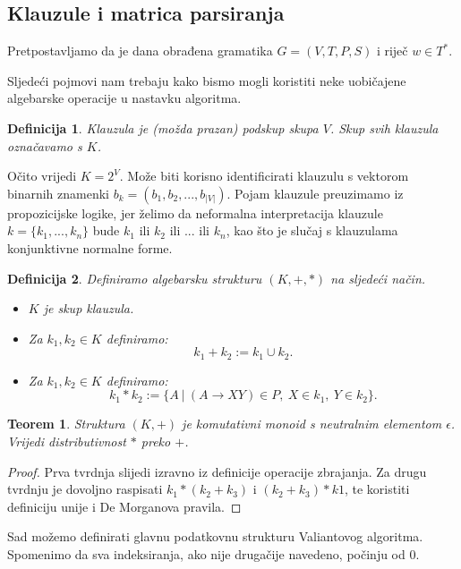 \documentclass[a4paper,oneside,12pt]{article} %
\newtheorem{lmdef}{Definicija}
\newtheorem{lmth}{Teorem}
\begin{document}
    \subsection{Klauzule i matrica parsiranja}
    Pretpostavljamo da je dana obrađena gramatika $G = (V, T, P, S)$ i riječ $w \in T^*$.
    
    Sljedeći pojmovi nam trebaju kako bismo mogli koristiti
        neke uobičajene algebarske operacije u nastavku algoritma.
    
    \begin{lmdef}
        Klauzula je (možda prazan) podskup skupa $V$. 
        Skup svih klauzula označavamo s $K$.
    \end{lmdef}
    Očito vrijedi $K = 2^V$. 
    Može biti korisno identificirati klauzulu s vektorom binarnih znamenki
        $b_k = (b_1, b_2, ..., b_{|V|})$.
    Pojam klauzule preuzimamo iz propozicijske logike,
        jer želimo da neformalna interpretacija klauzule $k = \{k_1, ..., k_n\}$
        bude $k_1$ ili $k_2$ ili ... ili $k_n$,
        kao što je slučaj s klauzulama konjunktivne normalne forme.
    
    \begin{lmdef}
        Definiramo algebarsku strukturu $(K, +, *)$ na sljedeći način.
        \begin{itemize}
            \item $K$ je skup klauzula.
            \item Za $k_1, k_2\in K$ definiramo:
            \[ k_1 + k_2 := k_1 \cup k_2. \]
            \item Za $k_1, k_2\in K$ definiramo:
            \[ k_1 * k_2 := \{ A\ |\ (A \to XY) \in P,\ X \in k_1,\ Y \in k_2  \}. \]
        \end{itemize}
    \end{lmdef}
    
    \begin{lmth}
        Struktura $(K, +)$ je komutativni monoid s neutralnim elementom $\epsilon$.
        Vrijedi distributivnost $*$ preko $+$.
    \end{lmth}
    \begin{proof}
        Prva tvrdnja slijedi izravno iz definicije operacije zbrajanja.
        Za drugu tvrdnju je dovoljno raspisati $k_1*(k_2 + k_3)$
            i $(k_2 + k_3) * k1$, te koristiti definiciju unije
            i De Morganova pravila.
    \end{proof}
    
    Sad možemo definirati glavnu podatkovnu strukturu Valiantovog algoritma.
    Spomenimo da sva indeksiranja, 
        ako nije drugačije navedeno,
        počinju od $0$.
    
\end{document}
